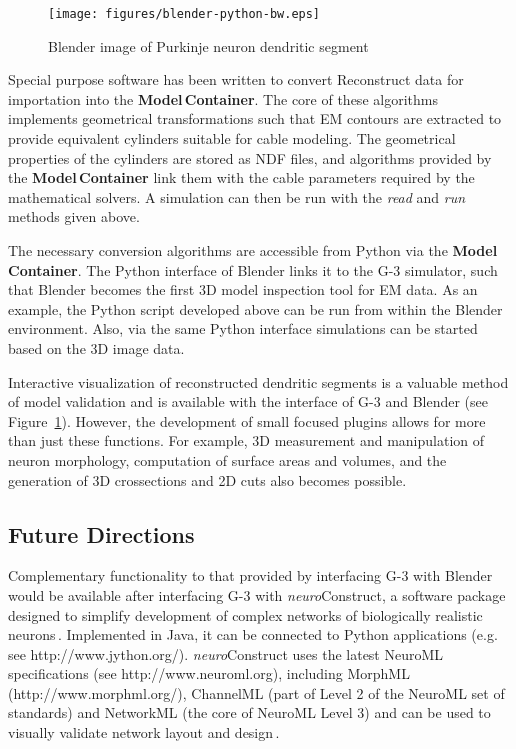 \documentclass[12pt]{article}
\begin{document}
\begin{figure}[ht]
  \centering
    \texttt{[image: figures/blender-python-bw.eps]}
  \caption{Blender image of Purkinje neuron dendritic segment}
  \label{fig:cbi-blender}
\end{figure}


Special purpose software has been written to convert Reconstruct data
for importation into the {\bf Model\,Container}.  The core of these
algorithms implements geometrical transformations such that EM
contours are extracted to provide equivalent cylinders suitable for
cable modeling.  The geometrical properties of the cylinders are
stored as NDF files, and algorithms provided by the {\bf Model\,Container}
link them with the cable parameters required by the mathematical
solvers.  A simulation can then be run with the {\it read} and {\it
  run} methods given above.

The necessary conversion algorithms are accessible from Python via the
{\bf Model\,Container}.  The Python interface of Blender links it to the G-3
simulator, such that Blender becomes the first 3D model inspection
tool for EM data.  As an example, the Python script developed above
can be run from within the Blender environment.  Also, via the same
Python interface simulations can be started based on the 3D image
data.

Interactive visualization of reconstructed dendritic segments is a
valuable method of model validation and is available with the
interface of G-3 and Blender (see Figure~\ref{fig:cbi-blender}).
However, the development of small focused plugins allows for more than
just these functions. For example, 3D measurement and manipulation of
neuron morphology, computation of surface areas and volumes, and the
generation of 3D crossections and 2D cuts also becomes possible.

\subsection{Future Directions}

Complementary functionality to that provided by interfacing G-3 with
Blender would be available after interfacing G-3 with {\it
  neuro}Construct, a software package designed to simplify development
of complex networks of biologically realistic
neurons\,\cite{gleeson05:_build_networ_model}.  Implemented in Java,
it can be connected to Python applications (e.g. see
http://www.jython.org/).  {\it neuro}Construct uses the latest NeuroML
specifications (see http://www.neuroml.org), including MorphML
(http://www.morphml.org/), ChannelML (part of Level 2 of the NeuroML
set of standards) and NetworkML (the core of NeuroML Level 3) and can
be used to visually validate network layout and
design\,\cite{crook07:_morph}.
\end{document}
